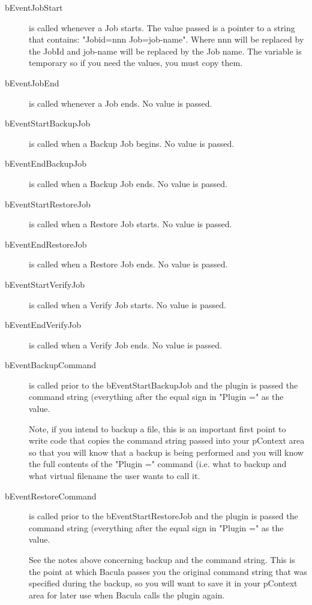 \begin{description}
 \item [bEventJobStart] is called whenever a Job starts. The value
   passed is a pointer to a string that contains: "Jobid=nnn 
   Job=job-name". Where nnn will be replaced by the JobId and job-name
   will be replaced by the Job name. The variable is temporary so if you
   need the values, you must copy them.

 \item [bEventJobEnd] is called whenever a Job ends. No value is passed.

 \item [bEventStartBackupJob] is called when a Backup Job begins. No value
   is passed.

 \item [bEventEndBackupJob] is called when a Backup Job ends. No value is 
   passed.

 \item [bEventStartRestoreJob] is called when a Restore Job starts. No value
   is passed.

 \item [bEventEndRestoreJob] is called when a Restore Job ends. No value is
   passed.

 \item [bEventStartVerifyJob] is called when a Verify Job starts. No value
   is passed.

 \item [bEventEndVerifyJob] is called when a Verify Job ends. No value
   is passed.

 \item [bEventBackupCommand] is called prior to the bEventStartBackupJob and
   the plugin is passed the command string (everything after the equal sign
   in "Plugin =" as the value.

   Note, if you intend to backup a file, this is an important first point to
   write code that copies the command string passed into your pContext area
   so that you will know that a backup is being performed and you will know
   the full contents of the "Plugin =" command (i.e. what to backup and
   what virtual filename the user wants to call it.

 \item [bEventRestoreCommand] is called prior to the bEventStartRestoreJob and
   the plugin is passed the command string (everything after the equal sign
   in "Plugin =" as the value.

   See the notes above concerning backup and the command string. This is the
   point at which Bacula passes you the original command string that was
   specified during the backup, so you will want to save it in your pContext
   area for later use when Bacula calls the plugin again.


\end{description}
